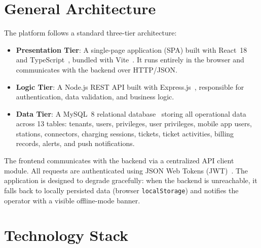 \documentclass[12pt,a4paper]{report}
\begin{document}
\section{General Architecture}

The platform follows a standard three-tier architecture:

\begin{itemize}
  \item \textbf{Presentation Tier}: A single-page application (SPA) built with React~18 and
        TypeScript~\autocite{react_docs, typescript_docs}, bundled with Vite~\autocite{vite_docs}. It
        runs entirely in the browser and communicates with the backend over HTTP/JSON.

  \item \textbf{Logic Tier}: A Node.js REST API built with Express.js~\autocite{nodejs_express},
        responsible for authentication, data validation, and business logic.

  \item \textbf{Data Tier}: A MySQL~8 relational database~\autocite{mysql_docs} storing all
        operational data across 13 tables: tenants, users, privileges, user privileges,
        mobile app users, stations, connectors, charging sessions, tickets, ticket activities,
        billing records, alerts, and push notifications.
\end{itemize}

The frontend communicates with the backend via a centralized API client module. All requests are
authenticated using JSON Web Tokens (JWT)~\autocite{rfc7519}. The application is designed to
degrade gracefully: when the backend is unreachable, it falls back to locally persisted data
(browser \texttt{localStorage}) and notifies the operator with a visible offline-mode banner.

\section{Technology Stack}
\end{document}
